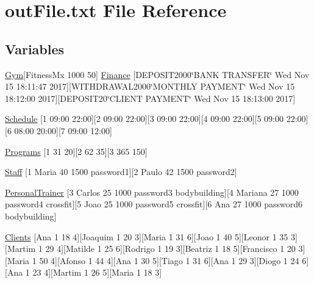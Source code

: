 \hypertarget{outFile_8txt}{}\section{out\+File.\+txt File Reference}
\label{outFile_8txt}
\subsection*{Variables}
\begin{DoxyCompactItemize}
\item 
\hyperlink{classGym}{Gym}\mbox{[}Fitness\+Mx 1000 50\mbox{]} \hyperlink{outFile_8txt_a4d8a5d84ce8d74c2e12ef31b160e54b1}{Finance} \mbox{[}D\+E\+P\+O\+S\+I\+T2000\char`\"{}B\+A\+NK T\+R\+A\+N\+S\+F\+ER\char`\"{} \textquotesingle{}Wed Nov 15 18\+:11\+:47 2017\textquotesingle{}\mbox{]}\mbox{[}W\+I\+T\+H\+D\+R\+A\+W\+A\+L2000\char`\"{}M\+O\+N\+T\+H\+LY P\+A\+Y\+M\+E\+NT\char`\"{} \textquotesingle{}Wed Nov 15 18\+:12\+:00 2017\textquotesingle{}\mbox{]}\mbox{[}D\+E\+P\+O\+S\+I\+T20\char`\"{}C\+L\+I\+E\+NT P\+A\+Y\+M\+E\+NT\char`\"{} \textquotesingle{}Wed Nov 15 18\+:13\+:00 2017\textquotesingle{}\mbox{]}
\item 
\hyperlink{outFile_8txt_a061a3989efe937642aa9d1dc75313167}{Schedule} \mbox{[}1 09\+:00 22\+:00\mbox{]}\mbox{[}2 09\+:00 22\+:00\mbox{]}\mbox{[}3 09\+:00 22\+:00\mbox{]}\mbox{[}4 09\+:00 22\+:00\mbox{]}\mbox{[}5 09\+:00 22\+:00\mbox{]}\mbox{[}6 08\+:00 20\+:00\mbox{]}\mbox{[}7 09\+:00 12\+:00\mbox{]}
\item 
\hyperlink{outFile_8txt_a079e4f76d2da3f02f43dfd6e67359bf7}{Programs} \mbox{[}1 31 20\mbox{]}\mbox{[}2 62 35\mbox{]}\mbox{[}3 365 150\mbox{]}
\item 
\hyperlink{outFile_8txt_ace2bec253417dd04567d51f2f7a892f0}{Staff} \mbox{[}1 Maria 40 1500 password1\mbox{]}\mbox{[}2 Paulo 42 1500 password2\mbox{]}
\item 
\hyperlink{outFile_8txt_a8aa9f45f51f1850059c6a3d9af92d5fd}{Personal\+Trainer} \mbox{[}3 Carlos 25 1000 password3 bodybuilding\mbox{]}\mbox{[}4 Mariana 27 1000 password4 crossfit\mbox{]}\mbox{[}5 Joao 25 1000 password5 crossfit\mbox{]}\mbox{[}6 Ana 27 1000 password6 bodybuilding\mbox{]}
\item 
\hyperlink{outFile_8txt_ab53c6b8a41aeef0c40b64d3d2c428a6b}{Clients} \mbox{[}Ana 1 18 4\mbox{]}\mbox{[}Joaquim 1 20 3\mbox{]}\mbox{[}Maria 1 31 6\mbox{]}\mbox{[}Joao 1 40 5\mbox{]}\mbox{[}Leonor 1 35 3\mbox{]}\mbox{[}Martim 1 29 4\mbox{]}\mbox{[}Matilde 1 25 6\mbox{]}\mbox{[}Rodrigo 1 19 3\mbox{]}\mbox{[}Beatriz 1 18 5\mbox{]}\mbox{[}Francisco 1 20 3\mbox{]}\mbox{[}Maria 1 50 4\mbox{]}\mbox{[}Afonso 1 44 4\mbox{]}\mbox{[}Ana 1 30 5\mbox{]}\mbox{[}Tiago 1 31 6\mbox{]}\mbox{[}Ana 1 29 3\mbox{]}\mbox{[}Diogo 1 24 6\mbox{]}\mbox{[}Ana 1 23 4\mbox{]}\mbox{[}Martim 1 26 5\mbox{]}\mbox{[}Maria 1 18 3\mbox{]}
\end{DoxyCompactItemize}


